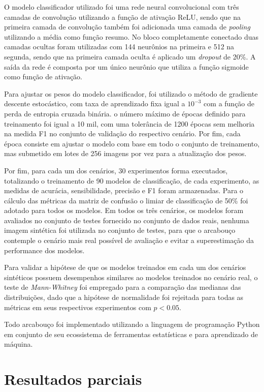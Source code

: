 O modelo classificador utilizado foi uma rede neural convolucional com três camadas de convolução utilizando a função de ativação ReLU, sendo que na primeira camada de convolução também foi adicionada uma camada de \textit{pooling} utilizando a média como função resumo. No bloco completamente conectado duas camadas ocultas foram utilizadas com 144 neurônios na primeira e 512 na segunda, sendo que na primeira camada oculta é aplicado um \textit{dropout} de 20\%. A saída da rede é composta por um único neurônio que utiliza a função sigmoide como função de ativação.

Para ajustar os pesos do modelo classificador, foi utilizado o método de gradiente descente estocástico, com taxa de aprendizado fixa igual a $10^{-3}$ com a função de perda de entropia cruzada binária. o número máximo de épocas definido para treinamento foi igual a 10 mil, com uma tolerância de 1200 épocas sem melhoria na medida F1 no conjunto de validação do respectivo cenário. Por fim, cada época consiste em ajustar o modelo com base em todo o conjunto de treinamento, mas submetido em lotes de 256 imagens por vez para a atualização dos pesos.

Por fim, para cada um dos cenários, 30 experimentos forma executados, totalizando o treinamento de 90 modelos de classificação, de cada experimento, as medidas de acurácia, sensibilidade, precisão e F1 foram armazenadas. Para o cálculo das métricas da matriz de confusão o limiar de classificação de 50\% foi adotado para todos os modelos. Em todos os três cenários, os modelos foram avaliados no conjunto de testes fornecido no conjunto de dados reais, nenhuma imagem sintética foi utilizada no conjunto de testes, para que o arcabouço contemple o cenário mais real possível de avaliação e evitar a superestimação da performance dos modelos.

Para validar a hipótese de que os modelos treinados em cada um dos cenários sintéticos possuem desempenhos similares ao modelos treinados no cenário real, o teste de \textit{Mann-Whitney} foi empregado para a comparação das medianas das distribuições, dado que a hipótese de normalidade foi rejeitada para todas as métricas em seus respectivos experimentos com $p < 0.05$.

Todo arcabouço foi implementado utilizando a linguagem de programação Python em conjunto de seu ecossistema de ferramentas estatísticas e para aprendizado de máquina.

\section{Resultados parciais}

